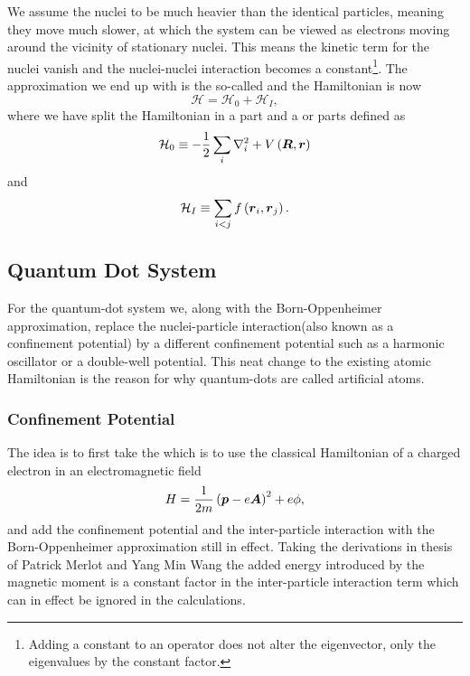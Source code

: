     We assume the nuclei to be much heavier than the identical particles,
    meaning they move much slower, at which the system can be viewed as
    electrons moving around the vicinity of stationary nuclei.  This means the
    kinetic term for the nuclei vanish and the nuclei-nuclei interaction
    becomes a constant\footnote{Adding a constant to an operator does not alter
    the eigenvector, only the eigenvalues by the constant
    factor\cite{linalgDavid}.}. The approximation we end up with is the
    so-called  and the Hamiltonian is now
        \begin{equation}
            \mathcal{H} = \mathcal{H}_0 + \mathcal{H}_I,
        \end{equation}
    where we have split the Hamiltonian in a  part and a
     or  parts defined as
        \begin{equation}
            \mathcal{H}_0 \equiv - \frac{1}{2} \sum\limits_i \nabla^2_i +
            V\left(\boldsymbol{{R}},\boldsymbol{{r}}\right)
        \end{equation}
    and
        \begin{equation}
            \mathcal{H}_I \equiv \sum_{i<j} f\left(\boldsymbol{{r}}_i,
            \boldsymbol{{r}}_j\right).
        \end{equation}

\subsection{Quantum Dot System}
    For the quantum-dot system we, along with the Born-Oppenheimer
    approximation, replace the nuclei-particle interaction(also known as a
    confinement potential) by a different confinement potential such as a
    harmonic oscillator or a double-well potential. This neat change to the
    existing atomic Hamiltonian is the reason for why quantum-dots are called
    artificial atoms. 

\subsubsection{Confinement Potential}
    The idea is to first take the  which is to use the
    classical Hamiltonian of a charged electron in an electromagnetic
    field\cite{claselcwiley}
        \begin{equation}
            H = \frac{1}{2m}\left(\boldsymbol{{p}} - e\boldsymbol{{A}}\right)^2 + e\phi,
        \end{equation}
    and add the confinement potential and the inter-particle interaction with
    the Born-Oppenheimer approximation still in effect. Taking the derivations
    in thesis of Patrick Merlot\cite{merlotthesis} and Yang Min
    Wang\cite{yangthesis} the added energy introduced by the magnetic moment is
    a constant factor in the inter-particle interaction term which can in
    effect be ignored in the calculations. 
    
